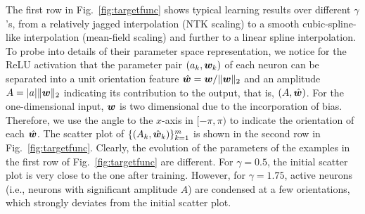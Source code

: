 \documentclass{article}
\begin{document}
The first row in Fig.~\ref{fig:targetfunc} shows typical learning results over different $\gamma$'s, from a relatively jagged interpolation (NTK scaling) to a smooth cubic-spline-like interpolation (mean-field scaling) and further to a linear spline interpolation. To probe into details of their parameter space representation, we notice for the ReLU activation that the parameter pair $(a_k,\bm{w}_k)$ of each neuron can be separated into a unit orientation feature $\hat{\bm{w}}=\bm{w}/\lVert\bm{w}\rVert_{2}$ and an amplitude $A=|a|\lVert\bm{w}\rVert_{2}$ indicating its contribution to the output, that is, $(A,\hat{\bm{w}})$. For the one-dimensional input, $\bm{w}$ is two dimensional due to the incorporation of bias. Therefore, we use the angle to the $x$-axis in $[-\pi,\pi)$ to indicate the orientation of each $\hat{\bm{w}}$. The scatter plot of $\{(A_k,\hat{\bm{w}}_k)\}_{k=1}^{m}$ is shown in the second row in Fig.~\ref{fig:targetfunc}. Clearly, the evolution of the parameters of the examples in the first row of Fig.~\ref{fig:targetfunc} are different. For $\gamma=0.5$, the initial scatter plot is very close to the one after training. However, for $\gamma=1.75$, active neurons (i.e., neurons with significant amplitude $A$) are condensed at a few orientations, which strongly deviates from the initial scatter plot.
\end{document}
